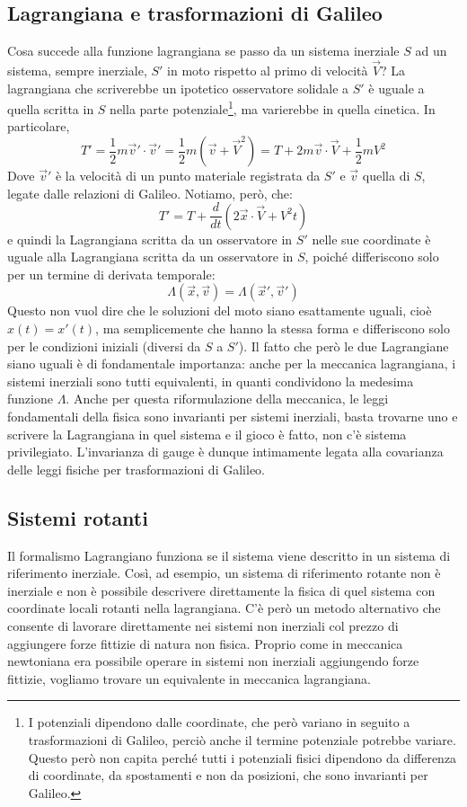 \documentclass[a4paper,openany]{article}
\begin{document}
	\subsection{Lagrangiana e trasformazioni di Galileo}
	Cosa succede alla funzione lagrangiana se passo da un sistema inerziale $S$ ad un sistema, sempre inerziale, $S'$ in moto rispetto al primo di velocità $\vec{V}$? La lagrangiana che scriverebbe un ipotetico osservatore solidale a $S'$ è uguale a quella scritta in $S$ nella parte potenziale\footnote{I potenziali dipendono dalle coordinate, che però variano in seguito a trasformazioni di Galileo, perciò anche il termine potenziale potrebbe variare. Questo però non capita perché tutti i potenziali fisici dipendono da differenza di coordinate, da spostamenti e non da posizioni, che sono invarianti per Galileo.}, ma varierebbe in quella cinetica. In particolare,
	$$
	T' = \dfrac{1}{2}m\vec{v}'\cdot\vec{v}'= \dfrac{1}{2}m(\vec{v}+\vec{V}^2) = T + 2m\vec{v}\cdot\vec{V}+\dfrac{1}{2}mV^{2}
	$$
	Dove $\vec{v}'$ è la velocità di un punto materiale registrata da $S'$ e $\vec{v}$ quella di $S$, legate dalle relazioni di Galileo. Notiamo, però, che:
	$$
	T' = T + \dfrac{d}{dt}(2\vec{x}\cdot\vec{V}+V^{2}t)
	$$
	e quindi la Lagrangiana scritta da un osservatore in $S'$ nelle sue coordinate è uguale alla Lagrangiana scritta da un osservatore in $S$, poiché differiscono solo per un termine di derivata temporale:
	$$
	\Lambda(\vec{x},\vec{v}) = \Lambda(\vec{x}',\vec{v}')
	$$
	Questo non vuol dire che le soluzioni del moto siano esattamente uguali, cioè $x(t) = x'(t)$, ma semplicemente che hanno la stessa forma e differiscono solo per le condizioni iniziali (diversi da $S$ a $S'$). Il fatto che però le due Lagrangiane siano uguali è di fondamentale importanza: anche per la meccanica lagrangiana, i sistemi inerziali sono tutti equivalenti, in quanti condividono la medesima funzione $\Lambda$. Anche per questa riformulazione della meccanica, le leggi fondamentali della fisica sono invarianti per sistemi inerziali, basta trovarne uno e scrivere la Lagrangiana in quel sistema e il gioco è fatto, non c'è sistema privilegiato. L'invarianza di gauge è dunque intimamente legata alla covarianza delle leggi fisiche per trasformazioni di Galileo.
	\subsection{Sistemi rotanti}
	Il formalismo Lagrangiano funziona se il sistema viene descritto in un sistema di riferimento inerziale. Così, ad esempio, un sistema di riferimento rotante non è inerziale e non è possibile descrivere direttamente la fisica di quel sistema con coordinate locali rotanti nella lagrangiana. C'è però un metodo alternativo che consente di lavorare direttamente nei sistemi non inerziali col prezzo di aggiungere forze fittizie di natura non fisica. Proprio come in meccanica newtoniana era possibile operare in sistemi non inerziali aggiungendo forze fittizie, vogliamo trovare un equivalente in meccanica lagrangiana.
	
\end{document}
